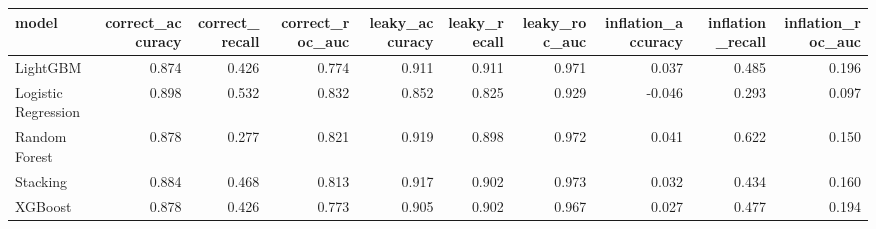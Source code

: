 \begin{tabular}{lrrrrrrrrr}
\toprule
model & correct_accuracy & correct_recall & correct_roc_auc & leaky_accuracy & leaky_recall & leaky_roc_auc & inflation_accuracy & inflation_recall & inflation_roc_auc \\
\midrule
LightGBM & 0.874 & 0.426 & 0.774 & 0.911 & 0.911 & 0.971 & 0.037 & 0.485 & 0.196 \\
Logistic Regression & 0.898 & 0.532 & 0.832 & 0.852 & 0.825 & 0.929 & -0.046 & 0.293 & 0.097 \\
Random Forest & 0.878 & 0.277 & 0.821 & 0.919 & 0.898 & 0.972 & 0.041 & 0.622 & 0.150 \\
Stacking & 0.884 & 0.468 & 0.813 & 0.917 & 0.902 & 0.973 & 0.032 & 0.434 & 0.160 \\
XGBoost & 0.878 & 0.426 & 0.773 & 0.905 & 0.902 & 0.967 & 0.027 & 0.477 & 0.194 \\
\bottomrule
\end{tabular}
